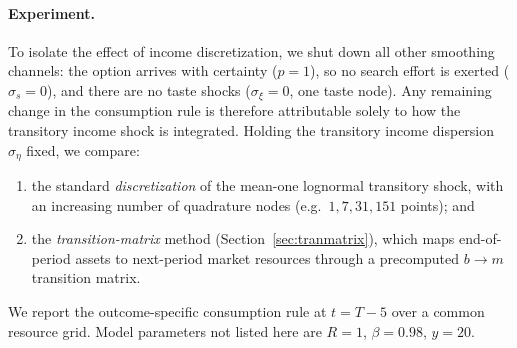 \documentclass[11pt]{article}
\begin{document}
\paragraph{Experiment.}
To isolate the effect of income discretization, we shut down all other smoothing
channels: the option arrives with certainty ($p = 1$), so no search effort is exerted
($\sigma_s = 0$), and there are no taste shocks ($\sigma_\xi = 0$, one taste node). Any
remaining change in the consumption rule is therefore attributable solely to how the
transitory income shock is integrated. Holding the transitory income dispersion
$\sigma_\eta$ fixed, we compare:
\begin{enumerate}
    \item the standard \emph{discretization} of the mean-one lognormal transitory shock,
    with an increasing number of quadrature nodes (e.g.\ $1, 7, 31, 151$ points); and
    \item the \emph{transition-matrix} method (Section~\ref{sec:tranmatrix}), which maps
    end-of-period assets to next-period market resources through a precomputed
    $b \to m$ transition matrix.
\end{enumerate}
We report the outcome-specific consumption rule at $t = T-5$ over a common resource grid.
Model parameters not listed here are $R = 1$, $\beta = 0.98$, $y = 20$.


\end{document}
